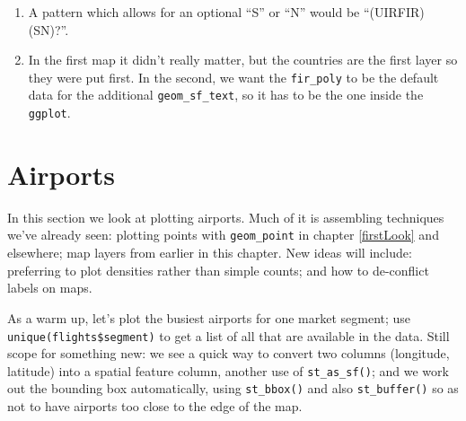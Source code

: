 \documentclass[
]{book}
\providecommand{\tightlist}{%
  \setlength{\itemsep}{0pt}\setlength{\parskip}{0pt}}
\begin{document}
\begin{enumerate}
\def\labelenumi{\arabic{enumi})}
\setcounter{enumi}{1}
\tightlist
\item
  A pattern which allows for an optional ``S'' or ``N'' would be ``(UIR\textbar FIR)(S\textbar N)?''.
\item
  In the first map it didn't really matter, but the countries are the first layer so they were put first. In the second, we want the \texttt{fir\_poly} to be the default data for the additional \texttt{geom\_sf\_text}, so it has to be the one inside the \texttt{ggplot}.
\end{enumerate}

\hypertarget{mapAirports}{%
\section{Airports}\label{mapAirports}}

In this section we look at plotting airports. Much of it is assembling techniques we've already seen: plotting points with \texttt{geom\_point} in chapter \ref{firstLook} and elsewhere; map layers from earlier in this chapter. New ideas will include: preferring to plot densities rather than simple counts; and how to de-conflict labels on maps.

As a warm up, let's plot the busiest airports for one market segment; use \texttt{unique(flights\$segment)} to get a list of all that are available in the data. Still scope for something new: we see a quick way to convert two columns (longitude, latitude) into a spatial feature column, another use of \texttt{st\_as\_sf()}; and we work out the bounding box automatically, using \texttt{st\_bbox()} and also \texttt{st\_buffer()} so as not to have airports too close to the edge of the map.
\end{document}
